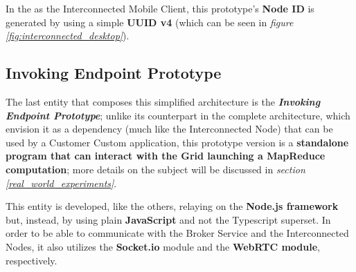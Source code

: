 In the  as the Interconnected Mobile Client, this prototype's \textbf{Node ID} is generated by using a simple \textbf{UUID v4} (which can be seen in \textit{figure \ref{fig:interconnected_desktop}}).

\subsection{Invoking Endpoint Prototype}
The last entity that composes this simplified architecture is the \textbf{\textit{Invoking Endpoint Prototype}}; unlike its counterpart in the complete architecture, which envision it as a dependency (much like the Interconnected Node) that can be used by a Customer Custom application, this prototype version is a \textbf{standalone program that can interact with the Grid launching a MapReduce computation}; more details on the subject will be discussed in \textit{section \ref{real_world_experiments}}.

This entity is developed, like the others, relaying on the \textbf{Node.js framework} but, instead, by using plain \textbf{JavaScript} and not the Typescript superset. In order to be able to communicate with the Broker Service and the Interconnected Nodes, it also utilizes the \textbf{Socket.io} module and the \textbf{WebRTC module}, respectively.
